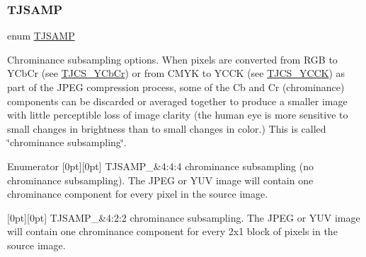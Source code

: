 \subsubsection{\texorpdfstring{T\+J\+S\+A\+MP}{TJSAMP}}
{\footnotesize\ttfamily enum \hyperlink{group___turbo_j_p_e_g_ga1d047060ea80bb9820d540bb928e9074}{T\+J\+S\+A\+MP}}

Chrominance subsampling options. When pixels are converted from R\+GB to Y\+Cb\+Cr (see \hyperlink{group___turbo_j_p_e_g_gga4f83ad3368e0e29d1957be0efa7c3720a7389b8f65bb387ffedce3efd0d78ec75}{T\+J\+C\+S\+\_\+\+Y\+Cb\+Cr}) or from C\+M\+YK to Y\+C\+CK (see \hyperlink{group___turbo_j_p_e_g_gga4f83ad3368e0e29d1957be0efa7c3720a53839e0fe867b76b58d16b0a1a7c598e}{T\+J\+C\+S\+\_\+\+Y\+C\+CK}) as part of the J\+P\+EG compression process, some of the Cb and Cr (chrominance) components can be discarded or averaged together to produce a smaller image with little perceptible loss of image clarity (the human eye is more sensitive to small changes in brightness than to small changes in color.) This is called \char`\"{}chrominance subsampling\char`\"{}. \begin{DoxyEnumFields}{Enumerator}
[0pt][0pt]{}\mbox{\label{group___turbo_j_p_e_g_gga1d047060ea80bb9820d540bb928e9074afb8da4f44197837bdec0a4f593dacae3}} 
T\+J\+S\+A\+M\+P\+\_&4\+:4\+:4 chrominance subsampling (no chrominance subsampling). The J\+P\+EG or Y\+UV image will contain one chrominance component for every pixel in the source image. \\
\hline

[0pt][0pt]{}\mbox{\label{group___turbo_j_p_e_g_gga1d047060ea80bb9820d540bb928e9074a136130902cc578f11f32429b59368404}} 
T\+J\+S\+A\+M\+P\+\_&4\+:2\+:2 chrominance subsampling. The J\+P\+EG or Y\+UV image will contain one chrominance component for every 2x1 block of pixels in the source image. \\
\hline


\end{DoxyEnumFields}
